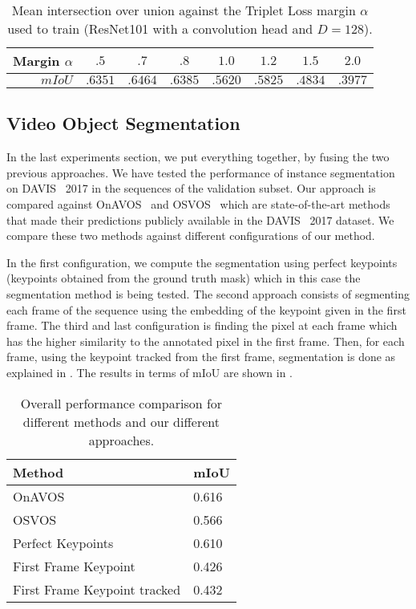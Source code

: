 \begin{table}[h]
  \centering
  \begin{tabular}{r|ccccccc}
    \toprule
    Margin $\alpha$ & $.5$    & $\mathbf{.7}$    & $.8$    & $1.0$   & $1.2$   & $1.5$   & $2.0$   \\
    \midrule
    $mIoU$          & $.6351$ & $\mathbf{.6464}$ & $.6385$ & $.5620$ & $.5825$ & $.4834$ & $.3977$ \\
    \bottomrule
  \end{tabular}
  \caption{Mean intersection over union against the Triplet Loss margin $\alpha$ used to train (ResNet101 with a convolution head and $D=128$). }
  \label{tab:experiments:segmentation:marginmiou}
\end{table}


\subsection{Video Object Segmentation}

In the last experiments section, we put everything together, by fusing the two previous approaches.
We have tested the performance of instance segmentation on DAVIS~\davislast{} 2017 in the sequences of the validation subset.
Our approach is compared against OnAVOS~\onavos{} and OSVOS~\osvos{} which are state-of-the-art methods that made their predictions publicly available in the DAVIS~\davislast{} 2017 dataset. We compare these two methods against different configurations of our method.

In the first configuration, we compute the segmentation using perfect keypoints (keypoints obtained from the ground truth mask) which in this case the segmentation method is being tested.
The second approach consists of segmenting each frame of the sequence using the embedding of the keypoint given in the first frame.
The third and last configuration is finding the pixel at each frame which has the higher similarity to the annotated pixel in the first frame.
Then, for each frame, using the keypoint tracked from the first frame, segmentation is done as explained in .
The results in terms of mIoU are shown in .

\begin{table}[h]
  \centering
  \begin{tabular}{l|l}
    \toprule
    Method                       & mIoU  \\
    \midrule
    OnAVOS~\onavos{}             & 0.616 \\
    OSVOS~\osvos{}               & 0.566 \\
    \midrule
    Perfect Keypoints            & 0.610 \\
    First Frame Keypoint         & 0.426 \\
    First Frame Keypoint tracked & 0.432 \\
    \bottomrule
  \end{tabular}
  \caption{Overall performance comparison for different methods and our different approaches.}
  \label{tab:experiments:videosegmentation:davismiou}
\end{table}

